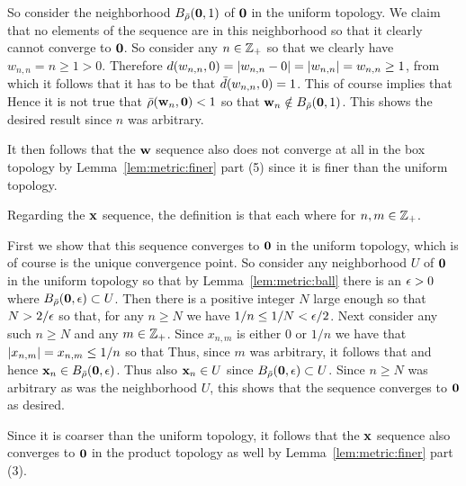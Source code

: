 {{    So consider the neighborhood $B_{\bar{\rho}}(\mathbf{0}, 1)$ of $\mathbf{0}$ in the uniform topology.
    We claim that no elements of the sequence are in this neighborhood so that it clearly cannot converge to $\mathbf{0}$.
    So consider any $n \in {{\mathbb{Z}}_+}$ so that we clearly have $w_{n,n} = n \geq 1 > 0$.
    Therefore $d(w_{n,n}, 0) = \left| w_{n,n} - 0 \right| = \left| w_{n,n} \right| = w_{n,n} \geq 1$, from which it follows that it has to be that $\bar{d}(w_{n,n}, 0) = 1$.
    This of course implies that
    Hence it is not true that $\bar{\rho}(\mathbf{w}_n, \mathbf{0}) < 1$ so that $\mathbf{w}_n \notin B_{\bar{\rho}}(\mathbf{0}, 1)$.
    This shows the desired result since $n$ was arbitrary.

    It then follows that the $\mathbf{w}$ sequence also does not converge at all in the box topology by Lemma~\ref{lem:metric:finer} part (5) since it is finer than the uniform topology.

    Regarding the $\mathbf{x}$ sequence, the definition is that each
    where
    for $n,m \in {{\mathbb{Z}}_+}$.

    First we show that this sequence converges to $\mathbf{0}$ in the uniform topology, which is of course is the unique convergence point.
    So consider any neighborhood $U$ of $\mathbf{0}$ in the uniform topology so that by Lemma~\ref{lem:metric:ball} there is an $\epsilon > 0$ where $B_{\bar{\rho}}(\mathbf{0}, \epsilon) \subset U$.
    Then there is a positive integer $N$ large enough so that $N > 2/\epsilon$ so that, for any $n \geq N$ we have $1/n \leq 1/N < \epsilon/2$.
    Next consider any such $n \geq N$ and any $m \in {{\mathbb{Z}}_+}$.
    Since $x_{n,m}$ is either $0$ or $1/n$ we have that $\left| x_{n,m} \right| = x_{n,m} \leq 1/n$ so that
    Thus, since $m$ was arbitrary, it follows that
    and hence $\mathbf{x}_n \in B_{\bar{\rho}}(\mathbf{0}, \epsilon)$.
    Thus also $\mathbf{x}_n \in U$ since $B_{\bar{\rho}}(\mathbf{0}, \epsilon) \subset U$.
    Since $n \geq N$ was arbitrary as was the neighborhood $U$, this shows that the sequence converges to $\mathbf{0}$ as desired.

    Since it is coarser than the uniform topology, it follows that the $\mathbf{x}$ sequence also converges to $\mathbf{0}$ in the product topology as well by Lemma~\ref{lem:metric:finer} part (3).

}}
